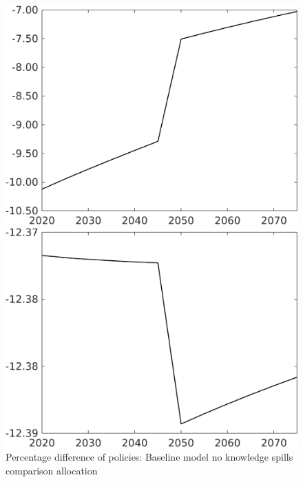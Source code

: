 \documentclass[12pt]{article}
\begin{document}
\begin{figure}[h!!]
	\centering
	\caption{Percentage difference of policies: Baseline model no knowledge spills comparison allocation}\label{fig:Pertauf_nsk0_xgr0_noknow}
	\begin{minipage}[]{0.32\textwidth}
		\includegraphics[width=1\textwidth]{../../codding_model/own_basedOnFried/optimalPol_010922_revision/figures/all_13Sept22/CompTaufPER_bytaul_Reg0_tauf_spillover0_nsk0_xgr0_knspil1_sep0_LFlimit1_emsbase0_countec0_GovRev0_etaa0.79_lgd0.png}
	\end{minipage}		
	\begin{minipage}[]{0.32\textwidth}
		\includegraphics[width=1\textwidth]{../../codding_model/own_basedOnFried/optimalPol_010922_revision/figures/all_13Sept22/CompTaufPER_bytaul_Reg0_hh_spillover0_nsk0_xgr0_knspil1_sep0_LFlimit1_emsbase0_countec0_GovRev0_etaa0.79_lgd0.png}

\end{minipage}
\end{figure}
\end{document}
